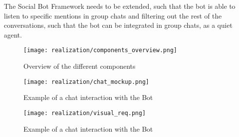 The Social Bot Framework needs to be extended, such that the bot is able to listen to specific mentions in group chats and filtering out the rest of the conversations, such that the bot can be integrated in group chats, as a quiet agent.

\begin{figure}[h]
    \centering
    \texttt{[image: realization/components\_overview.png]}
    \caption{Overview of the different components}
    \label{fig:componentsOverview}
\end{figure}

\begin{figure}[h]
    \centering
    \texttt{[image: realization/chat\_mockup.png]}
    \caption{Example of a chat interaction with the Bot}
    \label{fig:chatMockup}
\end{figure}

\begin{figure}[h]
    \centering
    \texttt{[image: realization/visual\_req.png]}
    \caption{Example of a chat interaction with the Bot}
    \label{fig:visualReq}
\end{figure}